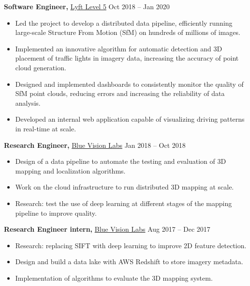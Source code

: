 \documentclass[margin]{res}
\begin{document}
\begin{resume}
            {\bf Software Engineer,} \href{https://www.lyft.com/self-driving-vehicles/}{Lyft Level 5}
            \hfill Oct 2018 -- Jan 2020\\
            \begin{itemize}
                \item Led the project to develop a distributed data pipeline, efficiently running large-scale Structure From Motion (SfM) on hundreds of millions of images.
                \item Implemented an innovative algorithm for automatic detection and 3D placement of traffic lights in imagery data, increasing the accuracy of point cloud generation.
                \item Designed and implemented dashboards to consistently monitor the quality of SfM point clouds, reducing errors and increasing the reliability of data analysis.
                \item Developed an internal web application capable of visualizing driving patterns in real-time at scale.
            \end{itemize}

            {\bf Research Engineer,} \href{http://www.bluevisionlabs.com}{Blue Vision Labs} \hfill Jan 2018 -- Oct 2018\\
            \begin{itemize}
                \item Design of a data pipeline to automate the testing and evaluation of 3D mapping and localization algorithms.
                \item Work on the cloud infrastructure to run distributed 3D mapping at scale.
                \item Research: test the use of deep learning at different stages of the mapping pipeline to improve quality.
            \end{itemize}

            {\bf Research Engineer intern,} \href{http://www.bluevisionlabs.com}{Blue Vision Labs} \hfill Aug 2017 -- Dec 2017\\
            \begin{itemize}
                \item Research: replacing SIFT with deep learning to improve 2D feature detection.
                \item Design and build a data lake with AWS Redshift to store imagery metadata.
                \item Implementation of algorithms to evaluate the 3D mapping system.
            \end{itemize}


\end{resume}
\end{document}
